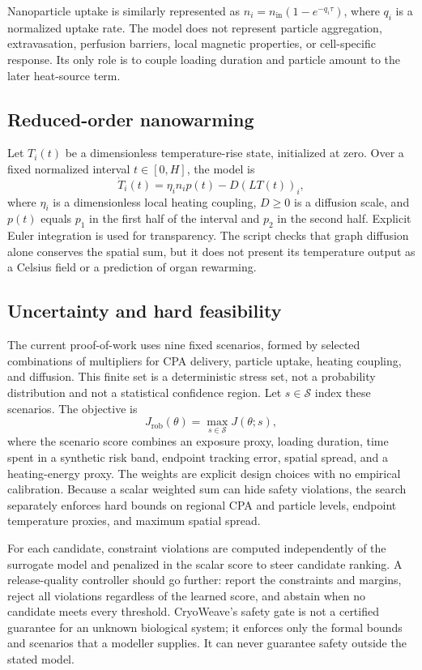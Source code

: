 \documentclass[11pt]{article}
\begin{document}
Nanoparticle uptake is similarly represented as $n_i=n_{\mathrm{in}}(1-e^{-q_i\tau})$, where $q_i$ is a normalized uptake rate. The model does not represent particle aggregation, extravasation, perfusion barriers, local magnetic properties, or cell-specific response. Its only role is to couple loading duration and particle amount to the later heat-source term.

\subsection{Reduced-order nanowarming}
Let $T_i(t)$ be a dimensionless temperature-rise state, initialized at zero. Over a fixed normalized interval $t\in[0,H]$, the model is
\begin{equation}
\dot{T}_i(t)=\eta_i n_i p(t)-D(LT(t))_i,
\label{eq:heat}
\end{equation}
where $\eta_i$ is a dimensionless local heating coupling, $D\geq0$ is a diffusion scale, and $p(t)$ equals $p_1$ in the first half of the interval and $p_2$ in the second half. Explicit Euler integration is used for transparency. The script checks that graph diffusion alone conserves the spatial sum, but it does not present its temperature output as a Celsius field or a prediction of organ rewarming.

\subsection{Uncertainty and hard feasibility}
The current proof-of-work uses nine fixed scenarios, formed by selected combinations of multipliers for CPA delivery, particle uptake, heating coupling, and diffusion. This finite set is a deterministic stress set, not a probability distribution and not a statistical confidence region. Let $s\in\mathcal{S}$ index these scenarios. The objective is
\begin{equation}
J_{\mathrm{rob}}(\theta)=\max_{s\in\mathcal{S}}J(\theta;s),
\label{eq:robust}
\end{equation}
where the scenario score combines an exposure proxy, loading duration, time spent in a synthetic risk band, endpoint tracking error, spatial spread, and a heating-energy proxy. The weights are explicit design choices with no empirical calibration. Because a scalar weighted sum can hide safety violations, the search separately enforces hard bounds on regional CPA and particle levels, endpoint temperature proxies, and maximum spatial spread.

For each candidate, constraint violations are computed independently of the surrogate model and penalized in the scalar score to steer candidate ranking. A release-quality controller should go further: report the constraints and margins, reject all violations regardless of the learned score, and abstain when no candidate meets every threshold. CryoWeave's safety gate is not a certified guarantee for an unknown biological system; it enforces only the formal bounds and scenarios that a modeller supplies. It can never guarantee safety outside the stated model.
\end{document}
